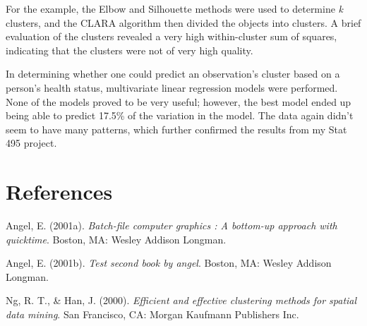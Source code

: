 \documentclass[12pt,twoside]{amherstthesis}
\begin{document}
  For the example, the Elbow and Silhouette methods were used to determine
  \emph{k} clusters, and the CLARA algorithm then divided the objects into
  clusters. A brief evaluation of the clusters revealed a very high
  within-cluster sum of squares, indicating that the clusters were not of
  very high quality.
  
  In determining whether one could predict an observation's cluster based
  on a person's health status, multivariate linear regression models were
  performed. None of the models proved to be very useful; however, the
  best model ended up being able to predict 17.5\% of the variation in the
  model. The data again didn't seem to have many patterns, which further
  confirmed the results from my Stat 495 project.
  
  \backmatter
  
  \chapter{References}\label{references}
  
  \noindent
  
  \setlength{\parindent}{-0.20in} \setlength{\leftskip}{0.20in}
  \setlength{\parskip}{8pt}
  
  \hypertarget{refs}{}
  \hypertarget{ref-angel2001}{}
  Angel, E. (2001a). \emph{Batch-file computer graphics : A bottom-up
  approach with quicktime}. Boston, MA: Wesley Addison Longman.
  
  \hypertarget{ref-angel2002a}{}
  Angel, E. (2001b). \emph{Test second book by angel}. Boston, MA: Wesley
  Addison Longman.
  
  \hypertarget{ref-ng1994}{}
  Ng, R. T., \& Han, J. (2000). \emph{Efficient and effective clustering
  methods for spatial data mining}. San Francisco, CA: Morgan Kaufmann
  Publishers Inc.


\end{document}

